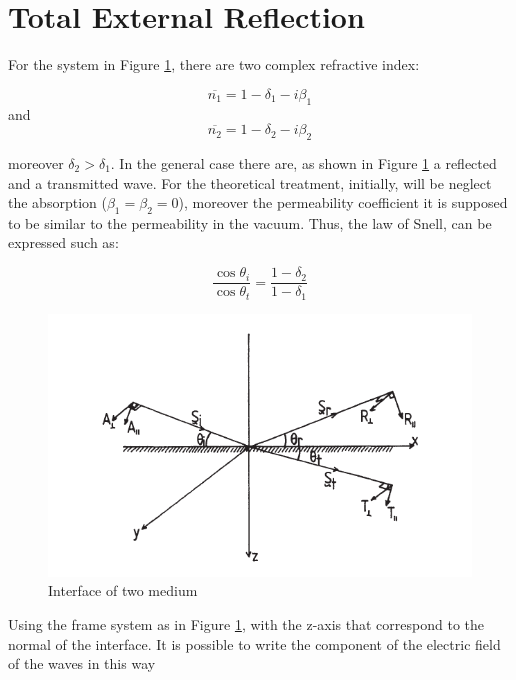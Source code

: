 \section{Total External Reflection}
\label{sec: Total Externa Reflection}
\begin{flushleft}
For the system in Figure \ref{fig: System}, there are two complex refractive index:
\end{flushleft}
\begin{equation}
\overline{n_1} = 1 - \delta_1 - i \beta_1
\label{eq: n1}
\end{equation}
and
\begin{equation}
\overline{n_2} = 1 - \delta_2 - i \beta_2
\label{eq: n1}
\end{equation}
\begin{flushleft}
moreover $\delta_2 > \delta_1 $. In the general case there are, as shown in Figure \ref{fig: System} a reflected and a transmitted wave. For the theoretical treatment, initially, will be neglect the absorption ($\beta_1 = \beta_2 = 0$), moreover the permeability coefficient it is supposed to be similar to the permeability in the vacuum. Thus, the law of Snell, can be expressed such as: 
\end{flushleft}
\begin{equation}
\frac{\cos \theta_i}{\cos \theta_t} = \frac{1 - \delta_2}{1 - \delta_1}
\label{eq: snell 1}
\end{equation}
\begin{figure}[]
%
\centering
%
\includegraphics[width=.6\textwidth]{Immagini/Chapter1/System}
%
\caption{Interface of two medium}
%
\label{fig: System}
%
\end{figure}
\begin{flushleft}
Using the frame system as in Figure \ref{fig: System}, with the z-axis that correspond to the normal of the interface. It is possible to write the component of the electric field of the waves in this way
\end{flushleft}
